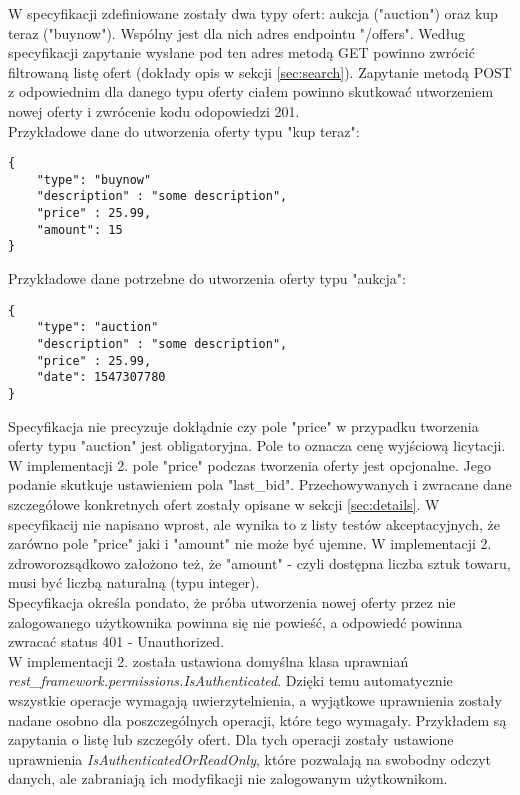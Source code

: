 \documentclass[12pt, notitlepage]{article}
\begin{document}
W specyfikacji zdefiniowane zostały dwa typy ofert: aukcja ("auction") oraz kup teraz ("buynow"). Wspólny jest dla nich adres endpointu "/offers". Według specyfikacji zapytanie wysłane pod ten adres metodą GET powinno zwrócić filtrowaną listę ofert (dokłady opis w sekcji \ref{sec:search}). Zapytanie metodą POST z odpowiednim dla danego typu oferty ciałem powinno skutkować utworzeniem nowej oferty i zwrócenie kodu odopowiedzi 201. \\

Przykładowe dane do utworzenia oferty typu "kup teraz":
\begin{lstlisting}
{     
    "type": "buynow"
    "description" : "some description",
    "price" : 25.99,
    "amount": 15
}
\end{lstlisting}

Przykładowe dane potrzebne do utworzenia oferty typu "aukcja":
\begin{lstlisting}
{     
    "type": "auction"
    "description" : "some description",
    "price" : 25.99,
    "date": 1547307780
}
\end{lstlisting}

Specyfikacja nie precyzuje dokłądnie czy pole "price" w przypadku tworzenia oferty typu "auction" jest obligatoryjna. Pole to oznacza cenę wyjściową licytacji. 
W implementacji 2. pole "price" podczas tworzenia oferty jest opcjonalne. Jego podanie skutkuje ustawieniem pola "last\_bid". Przechowywanych i zwracane dane szczegółowe konkretnych ofert zostały opisane w sekcji \ref{sec:details}. W specyfikacij nie napisano wprost, ale wynika to z listy testów akceptacyjnych, że zarówno pole "price" jaki i "amount" nie może być ujemne. W implementacji 2. zdroworozsądkowo założono też, że "amount" - czyli dostępna liczba sztuk towaru, musi być liczbą naturalną (typu integer). \\

Specyfikacja określa pondato, że próba utworzenia nowej oferty przez nie zalogowanego użytkownika powinna się nie powieść, a odpowiedć powinna zwracać status 401 - Unauthorized. \\
W implementacji 2. została ustawiona domyślna klasa uprawniań \textit{rest\_framework.permissions.IsAuthenticated}. Dzięki temu automatycznie wszystkie operacje wymagają uwierzytelnienia, a wyjątkowe uprawnienia zostały nadane osobno dla poszczególnych operacji, które tego wymagały. Przykładem są zapytania o listę lub szczegóły ofert. Dla tych operacji zostały ustawione uprawnienia \textit{IsAuthenticatedOrReadOnly}, które pozwalają na swobodny odczyt danych, ale zabraniają ich modyfikacji nie zalogowanym użytkownikom. \\
\end{document}
